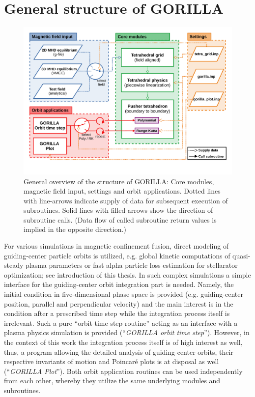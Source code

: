 \documentclass{TheMartianReport}
\begin{document}
\section{General structure of GORILLA}
\label{sec:gorilla_structure}
\begin{figure}[h]
	\centerline{\includegraphics[keepaspectratio,width=1.05\linewidth, trim=0 50 0 20, clip]{figures/flow_diagram_GORILLA_01.pdf}}
	\captionsetup{justification=raggedright,singlelinecheck=false,textfont=footnotesize,labelfont=footnotesize}
	\caption{General overview of the structure of GORILLA: Core modules,  magnetic field input,  settings and orbit applications. Dotted lines with line-arrows indicate supply of data for subsequent execution of subroutines. Solid lines with filled arrows show the direction of subroutine calls. (Data flow of called subroutine return values is implied in the opposite direction.)}
	\label{fig:flow_diagram_GORILLA_01}
\end{figure}

For various simulations in magnetic confinement fusion, direct modeling of guiding-center particle orbits is utilized, e.g. 
global kinetic computations of quasi-steady plasma parameters or fast alpha particle loss estimation for stellarator optimization; see introduction of this thesis.
In such complex simulations a simple interface for the guiding-center orbit integration part is needed. Namely, the initial condition in five-dimensional phase space is provided (e.g. guiding-center position, parallel and perpendicular velocity) and the main interest is in the condition after a prescribed time step while the integration process itself is irrelevant. 
Such a pure ``orbit time step routine'' acting as an interface with a plasma physics simulation is provided (``\textit{GORILLA orbit time step}'').
However, in the context of this work the integration process itself is of high interest as well, thus, a program allowing the detailed analysis of guiding-center orbits, their respective invariants of motion and Poincaré plots is at disposal as well (``\textit{GORILLA Plot}''). Both orbit application routines can be used independently from each other, whereby they utilize the same underlying modules and subroutines. 
\end{document}
